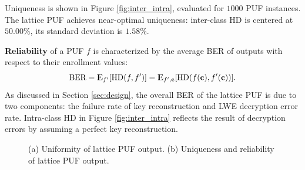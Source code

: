 Uniqueness is shown in Figure \ref{fig:inter_intra}, evaluated for $1000$ PUF instances. 
The lattice PUF achieves near-optimal uniqueness: inter-class HD is centered at $50.00\%$, its standard deviation is $1.58\%$. 

\textbf{Reliability} of a PUF $f$ is characterized by the average BER of outputs with respect to their enrollment values:
\begin{equation*}
\BER = \Expect_{f^\prime}[\HD(f,f^\prime)]= \Expect_{f^\prime,\mathbf{c}}[\HD(f(\mathbf{c}),f^\prime(\mathbf{c}))].
\end{equation*}
As discussed in Section \ref{sec:design}, the overall BER of the lattice PUF is due to two components: the failure rate of key reconstruction and LWE decryption error rate.
Intra-class HD in Figure \ref{fig:inter_intra} reflects the result of decryption errors by assuming a perfect key reconstruction. 



\begin{figure} 
    \centering
    \hfill
  \caption{(a) Uniformity of lattice PUF output. (b) Uniqueness and reliability of lattice PUF output.}
  \label{fig: lattice_puf_stats} 
\end{figure}

